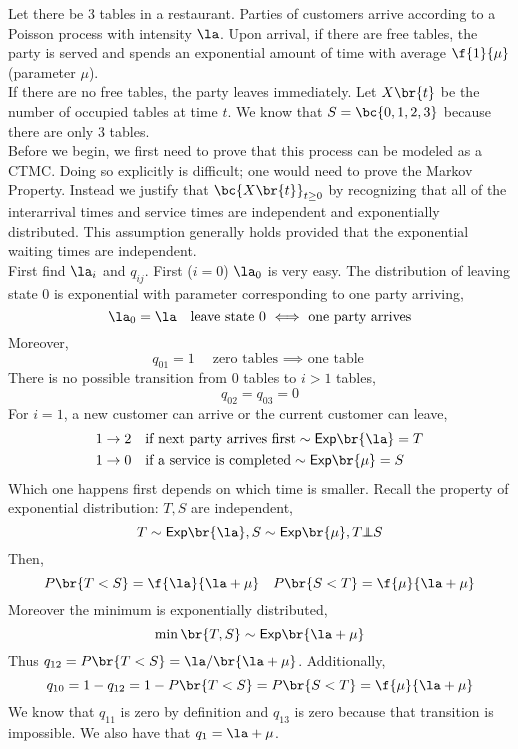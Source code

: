 \documentclass{article}
\newcommand{\indep}{\!\!\perp\!\!\!\!\perp\!\!}
\newcommand{\Ex}{\mathsf{Exp}}
\begin{document}
    \begin{example}
        Let there be 3 tables in a restaurant. Parties of customers arrive according to a Poisson process with intensity $\la$. Upon arrival, if there are free tables, the party is served and spends an exponential amount of time with average $\f{1}{\mu}$ (parameter $\mu$).\\

        If there are no free tables, the party leaves immediately. Let $X\br{t}$ be the number of occupied tables at time $t$. We know that $S = \bc{0,1,2,3}$ because there are only $3$ tables.\\

        Before we begin, we first need to prove that this process can be modeled as a CTMC. Doing so explicitly is difficult; one would need to prove the Markov Property. Instead we justify that $\bc{X\br{t}}_{t \geq 0}$ by recognizing that all of the interarrival times and service times are independent and exponentially distributed. This assumption generally holds provided that the exponential waiting times are independent. \\

        First find $\la_i$ and $q_{ij}$. First ($i = 0$) $\la_0$ is very easy. The distribution of leaving state $0$ is exponential with parameter corresponding to one party arriving,
        \[ \la_0 = \la \quad \text{leave state $0$ $\iff$ one party arrives}\]
        Moreover,
        \[ q_{01} = 1 \quad \text{zero tables $\implies$ one table} \]
        There is no possible transition from $0$ tables to $i > 1$ tables,
        \[ q_{02} = q_{03} = 0 \]
        For $i = 1$, a new customer can arrive or the current customer can leave,
        \begin{align*}
            1 &\to 2 \quad \text{if next party arrives first} \sim \Ex\br{\la} = T \\
            1 &\to 0 \quad \text{if a service is completed} \sim \Ex\br{\mu} = S
        \end{align*}
        Which one happens first depends on which time is smaller. Recall the property of exponential distribution: $T, S$ are independent,
        \[ T \sim \Ex\br{\la}, S \sim \Ex\br{\mu}, T \indep S \]
        Then,
        \[ P\br{T < S} = \f{\la}{\la + \mu} \quad P\br{S < T} = \f{\mu}{\la + \mu} \]
        Moreover the minimum is exponentially distributed,
        \[ \min\br{T,S} \sim \Ex\br{\la + \mu} \]
        Thus $q_{12} = P\br{T < S} = \la / \br{\la + \mu}$. Additionally,
        \[ q_{10} = 1 - q_{12} = 1 - P\br{T < S} = P\br{S < T} = \f{\mu}{\la + \mu} \]
        We know that $q_{11}$ is zero by definition and $q_{13}$ is zero because that transition is impossible. We also have that $q_{1} = \la + \mu$.\\


\end{example}
\end{document}

